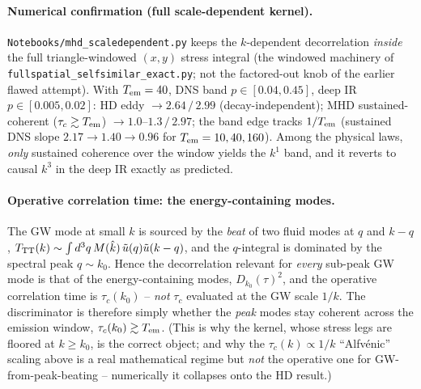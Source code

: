 \paragraph{Numerical confirmation (full scale-dependent kernel).}
\texttt{Notebooks/mhd\_scaledependent.py} keeps the $k$-dependent decorrelation \emph{inside}
the full triangle-windowed $(x,y)$ stress integral (the windowed machinery of
\texttt{fullspatial\_selfsimilar\_exact.py}; not the factored-out knob of the earlier flawed
attempt). With $T_{\rm em}=40$, DNS band $p\in[0.04,0.45]$, deep IR $p\in[0.005,0.02]$:
HD eddy $\to2.64\,/\,2.99$ (decay-independent); MHD sustained-coherent ($\tau_c\gtrsim T_{\rm em}$)
$\to1.0$--$1.3\,/\,2.97$; the band edge tracks $1/T_{\rm em}$ (sustained DNS slope
$2.17\to1.40\to0.96$ for $T_{\rm em}=10,40,160$). Among the physical laws, \emph{only} sustained
coherence over the window yields the $k^1$ band, and it reverts to causal $k^3$ in the deep IR
exactly as predicted.

\paragraph{Operative correlation time: the energy-containing modes.}
The GW mode at small $k$ is sourced by the \emph{beat} of two fluid modes at $q$ and $k-q$,
$T_{\rm TT}(k)\sim\int d^3q\,M(\hat k)\,\tilde u(q)\tilde u(k-q)$, and the $q$-integral is
dominated by the spectral peak $q\sim k_0$. Hence the decorrelation relevant for \emph{every}
sub-peak GW mode is that of the energy-containing modes, $D_{k_0}(\tau)^2$, and the operative
correlation time is $\tau_c(k_0)$ -- \emph{not} $\tau_c$ evaluated at the GW scale $1/k$. The
discriminator is therefore simply whether the \emph{peak} modes stay coherent across the
emission window, $\tau_c(k_0)\gtrsim T_{\rm em}$. (This is why the kernel, whose stress legs are
floored at $k\ge k_0$, is the correct object; and why the $\tau_c(k)\propto1/k$ ``Alfv\'enic''
scaling above is a real mathematical regime but \emph{not} the operative one for
GW-from-peak-beating -- numerically it collapses onto the HD result.)

